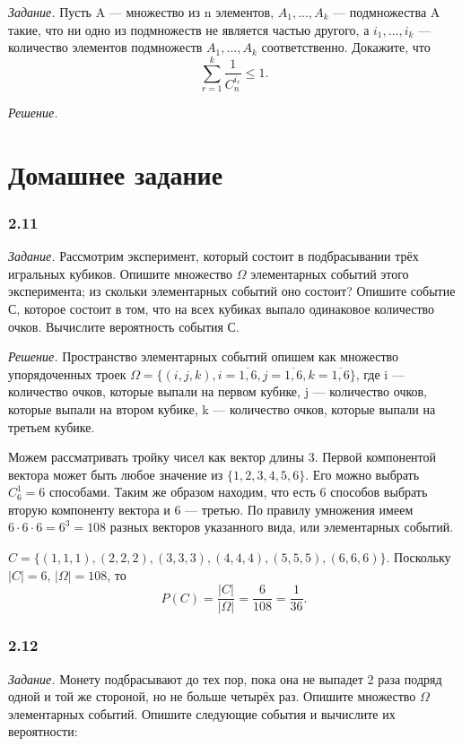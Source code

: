 \documentclass{book}
\begin{document}
\textit{Задание.} Пусть A --- множество из n элементов, $A_1, ..., A_k$ --- подмножества A такие, что ни одно из подмножеств не является частью другого, а $i_1, ..., i_k$ --- количество элементов подмножеств $A_1, ..., A_k$ соответственно. Докажите, что $$\sum\limits_{r=1}^k\frac{1}{C_n^{i_r}}\leq 1.$$

\textit{Решение.}

\section*{Домашнее задание}

\subsubsection*{2.11}

\textit{Задание.} Рассмотрим эксперимент, который состоит в подбрасывании трёх игральных кубиков. Опишите множество $\Omega$ элементарных событий этого эксперимента; из скольки элементарных событий оно состоит? Опишите событие С, которое состоит в том, что на всех кубиках выпало одинаковое количество очков. Вычислите вероятность события С.

\textit{Решение.} Пространство элементарных событий опишем как множество упорядоченных троек $\Omega=\{\left(i, j, k\right), i=\overline{1, 6}, j=\overline{1, 6}, k=\overline{1, 6}\}$, где i --- количество очков, которые выпали на первом кубике, j --- количество очков, которые выпали на втором кубике, k --- количество очков, которые выпали на третьем кубике.

Можем рассматривать тройку чисел как вектор длины 3. Первой компонентой вектора может быть любое значение из $\{1, 2, 3, 4, 5, 6\}$. Его можно выбрать $C_6^1=6$ способами. Таким же образом находим, что есть 6 способов выбрать вторую компоненту вектора и 6 --- третью. По правилу умножения имеем $6\cdot 6\cdot 6=6^3=108$ разных векторов указанного вида, или элементарных событий.

$C=\{(1, 1, 1), (2, 2, 2), (3, 3, 3), (4, 4, 4), (5, 5, 5), (6, 6, 6)\}$. Поскольку $|C|=6$, $|\Omega|=108$, то $$P(C)=\frac{|C|}{|\Omega|}=\frac{6}{108}=\frac{1}{36}.$$

\subsubsection*{2.12}

\textit{Задание.} Монету подбрасывают до тех пор, пока она не выпадет 2 раза подряд одной и той же стороной, но не больше четырёх раз. Опишите множество $\Omega$ элементарных событий. Опишите следующие события и вычислите их вероятности:
\end{document}
